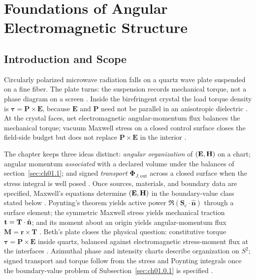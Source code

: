 ﻿\chapter{Foundations of Angular Electromagnetic Structure}
\label{ch:01}
\setcounter{section}{-1}


\section{Introduction and Scope}
\label{sec:ch01.0}

Circularly polarized microwave radiation falls on a quartz wave plate suspended on a fine fiber. The plate turns: the suspension records mechanical torque, not a phase diagram on a screen \cite{beth1936}. Inside the birefringent crystal the load torque density is $\boldsymbol{\tau}=\mathbf P\times\mathbf E$, because $\mathbf E$ and $\mathbf P$ need not be parallel in an anisotropic dielectric \cite{beth1936}. At the crystal faces, net electromagnetic angular-momentum flux balances the mechanical torque; vacuum Maxwell stress on a closed control surface closes the field-side budget but does not replace $\mathbf P\times\mathbf E$ in the interior \cite{beth1936,stratton1941}.

The chapter keeps three ideas distinct: \emph{angular organization} of $(\mathbf{E},\mathbf{H})$ on a chart; angular momentum \emph{associated} with a declared volume under the balances of section~\ref{sec:ch01.1}; and signed \emph{transport} $\boldsymbol{\Phi}_{J,\mathrm{out}}$ across a closed surface when the stress integral is well posed \cite{stratton1941,beth1936}. Once sources, materials, and boundary data are specified, Maxwell's equations determine $(\mathbf{E},\mathbf{H})$ in the boundary-value class stated below \cite{maxwell1873,stratton1941}. Poynting's theorem yields active power $\Re(\mathbf{S}_\mathrm{c}\cdot\hat{\mathbf{n}})$ through a surface element; the symmetric Maxwell stress yields mechanical traction $\mathbf{t}=\mathbf{T}\cdot\hat{\mathbf{n}}$; and its moment about an origin yields angular-momentum flux $\mathbf{M}=\mathbf{r}\times\mathbf{T}$ \cite{poynting1884,maxwell1873,beth1936}. Beth's plate closes the physical question: constitutive torque $\boldsymbol{\tau}=\mathbf P\times\mathbf E$ inside quartz, balanced against electromagnetic stress-moment flux at the interfaces \cite{beth1936,stratton1941}. Azimuthal phase and intensity charts describe organization on $S^2$; signed transport and torque follow from the stress and Poynting integrals once the boundary-value problem of Subsection~\ref{sec:ch01.0.1} is specified \cite{allen1992,stratton1941}.

